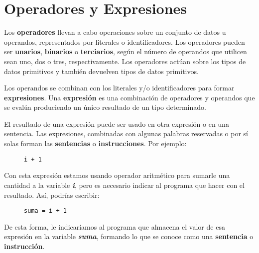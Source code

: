\section{Operadores y Expresiones}
Los \textbf{operadores} llevan a cabo operaciones sobre un conjunto de datos u operandos, representados por literales o identificadores. Los operadores pueden ser \textbf{unarios}, \textbf{binarios} o \textbf{terciarios}, según el número de operandos que utilicen sean uno, dos o tres, respectivamente. Los operadores actúan sobre los tipos de datos primitivos y también devuelven tipos de datos primitivos.

Los operandos se combinan con los literales y/o identificadores para formar \textbf{expresiones}. Una \textbf{expresión} es una combinación de operadores y operandos que se evalúa produciendo un único resultado de un tipo determinado.

El resultado de una expresión puede ser usado en otra expresión o en una sentencia. Las expresiones, combinadas con algunas palabras reservadas o por sí solas forman las \textbf{sentencias} o \textbf{instrucciones}. Por ejemplo:

\begin{figure}[H]
    \begin{tcolorbox}[sharp corners, colback=yellow!30, colframe=white!20]
        \scriptsize
\begin{verbatim}i + 1\end{verbatim}
    \end{tcolorbox}
\end{figure}

Con esta expresión estamos usando operador aritmético para sumarle una cantidad a la variable \textbf{\textit{i}}, pero es necesario indicar al programa que hacer con el resultado. Así, podrías escribir:

\begin{figure}[H]
    \begin{tcolorbox}[sharp corners, colback=yellow!30, colframe=white!20]
        \scriptsize
        \begin{verbatim}suma = i + 1\end{verbatim}
    \end{tcolorbox}
\end{figure}

De esta forma, le indicaríamos al programa que almacena el valor de esa expresión en la variable \textbf{\textit{suma}}, formando lo que se conoce como una \textbf{sentencia} o \textbf{instrucción}.

